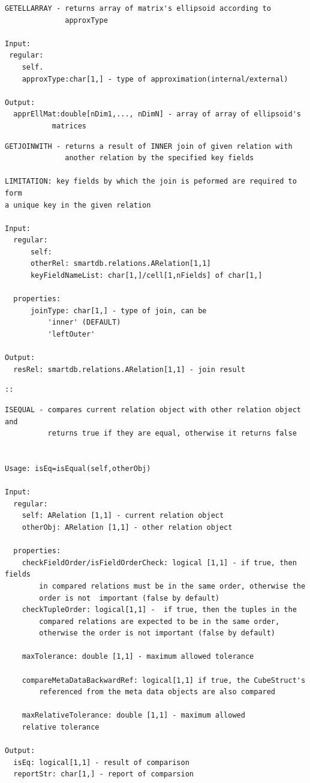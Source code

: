 \documentclass[letterpaper,10pt,english]{sphinxmanual}
\begin{document}
\begin{Verbatim}[commandchars=\\\{\}]
GETELLARRAY - returns array of matrix's ellipsoid according to
              approxType

Input:
 regular:
    self.
    approxType:char[1,] - type of approximation(internal/external)

Output:
  apprEllMat:double[nDim1,..., nDimN] - array of array of ellipsoid's
           matrices
\end{Verbatim}

\begin{Verbatim}[commandchars=\\\{\}]
GETJOINWITH - returns a result of INNER join of given relation with
              another relation by the specified key fields

LIMITATION: key fields by which the join is peformed are required to form
a unique key in the given relation

Input:
  regular:
      self:
      otherRel: smartdb.relations.ARelation[1,1]
      keyFieldNameList: char[1,]/cell[1,nFields] of char[1,]

  properties:
      joinType: char[1,] - type of join, can be
          'inner' (DEFAULT)
          'leftOuter'

Output:
  resRel: smartdb.relations.ARelation[1,1] - join result
\end{Verbatim}

\begin{Verbatim}[commandchars=\\\{\}]
::
\end{Verbatim}

\begin{Verbatim}[commandchars=\\\{\}]
ISEQUAL - compares current relation object with other relation object and
          returns true if they are equal, otherwise it returns false


Usage: isEq=isEqual(self,otherObj)

Input:
  regular:
    self: ARelation [1,1] - current relation object
    otherObj: ARelation [1,1] - other relation object

  properties:
    checkFieldOrder/isFieldOrderCheck: logical [1,1] - if true, then fields
        in compared relations must be in the same order, otherwise the
        order is not  important (false by default)
    checkTupleOrder: logical[1,1] -  if true, then the tuples in the
        compared relations are expected to be in the same order,
        otherwise the order is not important (false by default)

    maxTolerance: double [1,1] - maximum allowed tolerance

    compareMetaDataBackwardRef: logical[1,1] if true, the CubeStruct's
        referenced from the meta data objects are also compared

    maxRelativeTolerance: double [1,1] - maximum allowed
    relative tolerance

Output:
  isEq: logical[1,1] - result of comparison
  reportStr: char[1,] - report of comparsion
\end{Verbatim}
\end{document}
